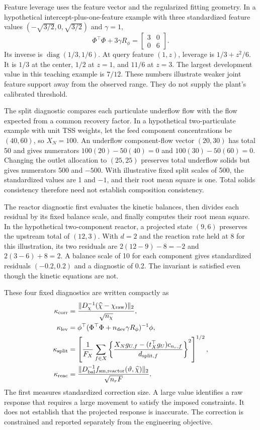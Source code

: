 Feature leverage uses the feature vector and the regularized fitting geometry. In a hypothetical intercept-plus-one-feature example with three standardized feature values $(-\sqrt{3/2},0,\sqrt{3/2})$ and $\gamma=1$,
\begin{equation}
\Phi^\top\Phi+3\gamma R_\phi=
\begin{bmatrix}3&0\\0&6\end{bmatrix}.
\end{equation}
Its inverse is $\operatorname{diag}(1/3,1/6)$. At query feature $(1,z)$, leverage is $1/3+z^2/6$. It is $1/3$ at the center, $1/2$ at $z=1$, and $11/6$ at $z=3$. The largest development value in this teaching example is $7/12$. These numbers illustrate weaker joint feature support away from the observed range. They do not supply the plant's calibrated threshold.

The split diagnostic compares each particulate underflow flow with the flow expected from a common recovery factor. In a hypothetical two-particulate example with unit TSS weights, let the feed component concentrations be $(40,60)$, so $X_N=100$. An underflow component-flow vector $(20,30)$ has total 50 and gives numerators $100(20)-50(40)=0$ and $100(30)-50(60)=0$. Changing the outlet allocation to $(25,25)$ preserves total underflow solids but gives numerators 500 and $-500$. With illustrative fixed split scales of 500, the standardized values are 1 and $-1$, and their root mean square is one. Total solids consistency therefore need not establish composition consistency.

The reactor diagnostic first evaluates the kinetic balances, then divides each residual by its fixed balance scale, and finally computes their root mean square. In the hypothetical two-component reactor, a projected state $(9,6)$ preserves the upstream total of $(12,3)$. With $d=2$ and the reaction rate held at 8 for this illustration, its two residuals are $2(12-9)-8=-2$ and $2(3-6)+8=2$. A balance scale of 10 for each component gives standardized residuals $(-0.2,0.2)$ and a diagnostic of 0.2. The invariant is satisfied even though the kinetic equations are not.

These four fixed diagnostics are written compactly as
\begin{align}
\kappa_{\rm corr}&=\frac{\|D_\chi^{-1}(\widehat\chi-\chi_{\rm raw})\|_2}{\sqrt{n_\chi}},\\
\kappa_{\rm lev}&=\phi^\top(\Phi^\top\Phi+n_{\rm dev}\gamma R_\phi)^{-1}\phi,\\
\kappa_{\rm split}&=\left[\frac1{F_X}\sum_{f\in X}
\left\{\frac{X_Ng_{U,f}-(t_X^\top g_U)c_{n_r,f}}{d_{{\rm split},f}}\right\}^2\right]^{1/2},\\
\kappa_{\rm reac}&=\frac{\|D_{\rm bal}^{-1}f_{{\rm sm},\rm reactor}(\vartheta,\widehat\chi)\|_2}{\sqrt{n_rF}}.
\label{eq:plant_trust_diagnostics}
\end{align}
The first measures standardized correction size. A large value identifies a raw response that requires a large movement to satisfy the imposed constraints. It does not establish that the projected response is inaccurate. The correction is constrained and reported separately from the engineering objective.

